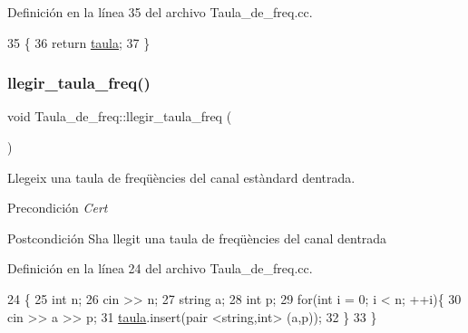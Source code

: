Definición en la línea 35 del archivo Taula\+\_\+de\+\_\+freq.\+cc.


\begin{DoxyCode}
35                                                      \{
36     \textcolor{keywordflow}{return} \hyperlink{class_taula__de__freq_a2c7db75db1ccbbe347de775844f3bbd7}{taula};
37 \}
\end{DoxyCode}
\mbox{\label{class_taula__de__freq_a6e3d7bfaa7227f9b7603864c7a3da2cf}} 
\subsubsection{\texorpdfstring{llegir\+\_\+taula\+\_\+freq()}{llegir\_taula\_freq()}}
{\footnotesize\ttfamily void Taula\+\_\+de\+\_\+freq\+::llegir\+\_\+taula\+\_\+freq (\begin{DoxyParamCaption}{ }\end{DoxyParamCaption})}



Llegeix una taula de freqüències del canal estàndard d\textquotesingle{}entrada. 

\begin{DoxyPrecond}{Precondición}
{\itshape Cert} 
\end{DoxyPrecond}
\begin{DoxyPostcond}{Postcondición}
S\textquotesingle{}ha llegit una taula de freqüències del canal d\textquotesingle{}entrada 
\end{DoxyPostcond}


Definición en la línea 24 del archivo Taula\+\_\+de\+\_\+freq.\+cc.


\begin{DoxyCode}
24                                       \{
25     \textcolor{keywordtype}{int} n;
26     cin >> n;
27     \textcolor{keywordtype}{string} a;
28     \textcolor{keywordtype}{int} p;
29     \textcolor{keywordflow}{for}(\textcolor{keywordtype}{int} i = 0; i < n; ++i)\{
30         cin >> a >> p;
31         \hyperlink{class_taula__de__freq_a2c7db75db1ccbbe347de775844f3bbd7}{taula}.insert(pair <string,int> (a,p));
32     \}
33 \}
\end{DoxyCode}
\mbox{\label{class_taula__de__freq_a60e643811c232a7ca679c2bf43dcb79c}} 

